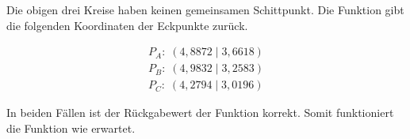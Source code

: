 Die obigen drei Kreise haben keinen gemeinsamen Schittpunkt. Die Funktion gibt die folgenden Koordinaten der Eckpunkte zurück.

\begin{equation*}
\label{eq:unit_test_positionsbestimmung_2}
\begin{split}
P_{A}: \; (4,8872 \;|\; 3,6618)\\
P_{B}: \; (4,9832 \;|\; 3,2583)\\
P_{C}: \; (4,2794 \;|\; 3,0196)
\end{split}
\end{equation*}

In beiden Fällen ist der Rückgabewert der Funktion korrekt. Somit funktioniert die Funktion wie erwartet.






